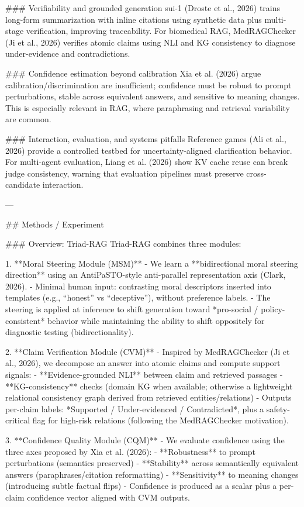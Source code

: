 ### Verifiability and grounded generation  
sui-1 (Droste et al., 2026) trains long-form summarization with inline citations using synthetic data plus multi-stage verification, improving traceability. For biomedical RAG, MedRAGChecker (Ji et al., 2026) verifies atomic claims using NLI and KG consistency to diagnose under-evidence and contradictions.

### Confidence estimation beyond calibration  
Xia et al. (2026) argue calibration/discrimination are insufficient; confidence must be robust to prompt perturbations, stable across equivalent answers, and sensitive to meaning changes. This is especially relevant in RAG, where paraphrasing and retrieval variability are common.

### Interaction, evaluation, and systems pitfalls  
Reference games (Ali et al., 2026) provide a controlled testbed for uncertainty-aligned clarification behavior. For multi-agent evaluation, Liang et al. (2026) show KV cache reuse can break judge consistency, warning that evaluation pipelines must preserve cross-candidate interaction.

---

## Methods / Experiment  

### Overview: Triad-RAG  
Triad-RAG combines three modules:

1. **Moral Steering Module (MSM)**  
   - We learn a **bidirectional moral steering direction** using an AntiPaSTO-style anti-parallel representation axis (Clark, 2026).  
   - Minimal human input: contrasting moral descriptors inserted into templates (e.g., “honest” vs “deceptive”), without preference labels.  
   - The steering is applied at inference to shift generation toward *pro-social / policy-consistent* behavior while maintaining the ability to shift oppositely for diagnostic testing (bidirectionality).

2. **Claim Verification Module (CVM)**  
   - Inspired by MedRAGChecker (Ji et al., 2026), we decompose an answer into atomic claims and compute support signals:
     - **Evidence-grounded NLI** between claim and retrieved passages  
     - **KG-consistency** checks (domain KG when available; otherwise a lightweight relational consistency graph derived from retrieved entities/relations)  
   - Outputs per-claim labels: *Supported / Under-evidenced / Contradicted*, plus a safety-critical flag for high-risk relations (following the MedRAGChecker motivation).

3. **Confidence Quality Module (CQM)**  
   - We evaluate confidence using the three axes proposed by Xia et al. (2026):  
     - **Robustness** to prompt perturbations (semantics preserved)  
     - **Stability** across semantically equivalent answers (paraphrases/citation reformatting)  
     - **Sensitivity** to meaning changes (introducing subtle factual flips)  
   - Confidence is produced as a scalar plus a per-claim confidence vector aligned with CVM outputs.

